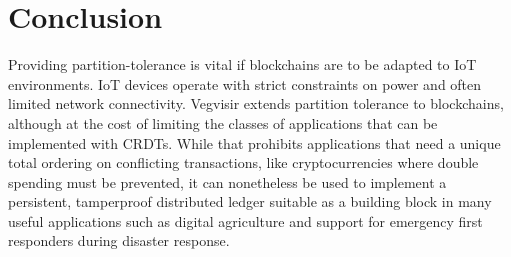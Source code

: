 \documentclass[conference, letterpaper]{IEEEtran}
\begin{document}



\section{Conclusion}
\label{sec:discussion}

Providing partition-tolerance is vital if blockchains are to be adapted to IoT environments. IoT devices operate with strict constraints on power and often limited network connectivity. Vegvisir extends partition tolerance to blockchains, although at the cost of limiting the classes of applications that can be implemented with CRDTs. While that prohibits applications that need a unique total ordering on conflicting transactions, like cryptocurrencies where double spending must be prevented, it can nonetheless be used to implement a persistent, tamperproof distributed ledger suitable as a building block in many useful applications such as digital agriculture and support for emergency first responders during disaster response. 
\end{document}
